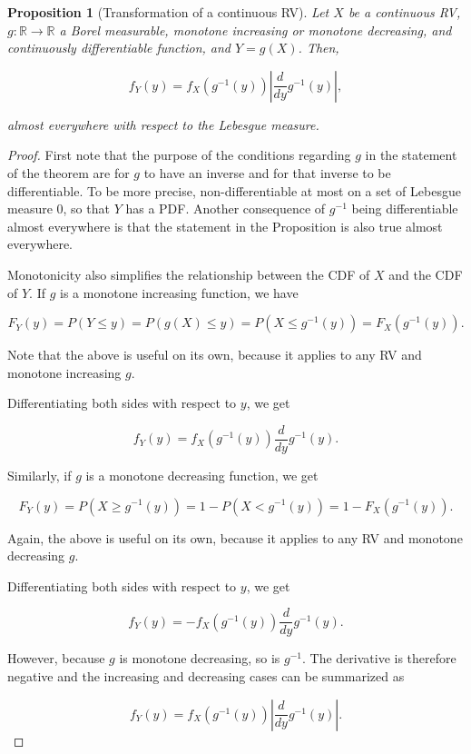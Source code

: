 \documentclass{book}
\theoremstyle{plain}%
\newtheorem{proposition}{Proposition}[section]
\theoremstyle{definition}
\newlength{\arrow}
\begin{document}
\begin{proposition}[Transformation of a continuous RV]
Let $X$ be a continuous RV, $g: \mathbb{R} \rightarrow \mathbb{R}$ a Borel measurable, monotone increasing or monotone decreasing, and continuously differentiable function, and $Y = g(X)$. Then,

$$f_Y(y) = f_X(g^{-1}(y)) |\frac{d}{dy}g^{-1}(y)|,$$ 

almost everywhere with respect to the Lebesgue measure.
\end{proposition}

\begin{proof} First note that the purpose of the conditions regarding $g$ in the statement of the theorem are for $g$ to have an inverse and for that inverse to be differentiable. To be more precise, non-differentiable at most on a set of Lebesgue measure 0, so that $Y$ has a PDF. Another consequence of $g^{-1}$ being differentiable almost everywhere is that the statement in the Proposition is also true almost everywhere.

Monotonicity also simplifies the relationship between the CDF of $X$ and the CDF of $Y$. If $g$ is a monotone increasing function, we have 

$$F_Y(y) = P(Y \leq y) = P(g(X) \leq y) = P(X \leq g^{-1}(y)) = F_X(g^{-1}(y)).$$

Note that the above is useful on its own, because it applies to any RV and monotone increasing $g$.

Differentiating both sides with respect to $y$, we get

$$f_Y(y) = f_X(g^{-1}(y)) \frac{d}{dy}g^{-1}(y).$$

Similarly, if $g$ is a monotone decreasing function, we get 

$$F_Y(y) = P(X \geq g^{-1}(y)) = 1 - P(X < g^{-1}(y)) = 1 - F_X(g^{-1}(y)).$$

Again, the above is useful on its own, because it applies to any RV and monotone decreasing $g$.

Differentiating both sides with respect to $y$, we get

$$f_Y(y) = - f_X(g^{-1}(y)) \frac{d}{dy}g^{-1}(y).$$

However, because $g$ is monotone decreasing, so is $g^{-1}$. The derivative is therefore negative and the increasing and decreasing cases can be summarized as


$$f_Y(y) = f_X(g^{-1}(y)) |\frac{d}{dy}g^{-1}(y)|.$$
\end{proof}
\end{document}
